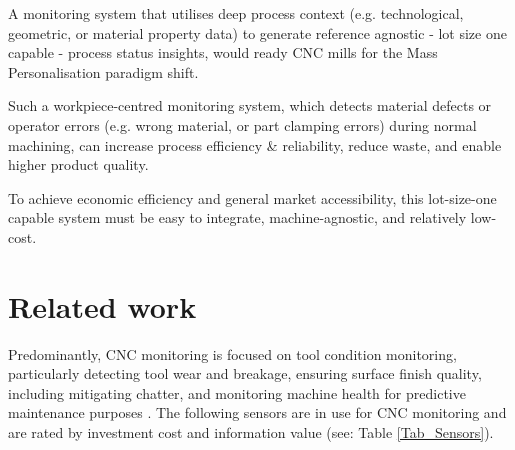 \documentclass[5p,times,procedia]{elsarticle}
\begin{document}
\vspace*{-\baselineskip}
\begin{nomenclature}
\begin{deflist}[AAA]%
\end{deflist}
\end{nomenclature}%


A monitoring system that utilises deep process context (e.g. technological, geometric, or material property data) to generate reference agnostic - lot size one capable - process status insights, would ready CNC mills for the Mass Personalisation paradigm shift.

Such a workpiece-centred monitoring system, which detects material defects or operator errors (e.g. wrong material, or part clamping errors) during normal machining, can increase process efficiency \& reliability, reduce waste, and enable higher product quality.  

To achieve economic efficiency and general market accessibility, this lot-size-one capable system must be easy to integrate, machine-agnostic, and relatively low-cost.


 
\section{Related work}\label{Sec_RelatedWork}




Predominantly, CNC monitoring is focused on tool condition monitoring, particularly detecting tool wear and breakage, ensuring surface finish quality, including mitigating chatter, and monitoring machine health for predictive maintenance purposes \cite[p.2727]{Kuntoglu.Salur.ea2021}.
The following sensors are in use for CNC monitoring and are rated by investment cost and information value (see: Table \ref{Tab_Sensors}).
\vspace*{-.5\baselineskip}
\end{document}
